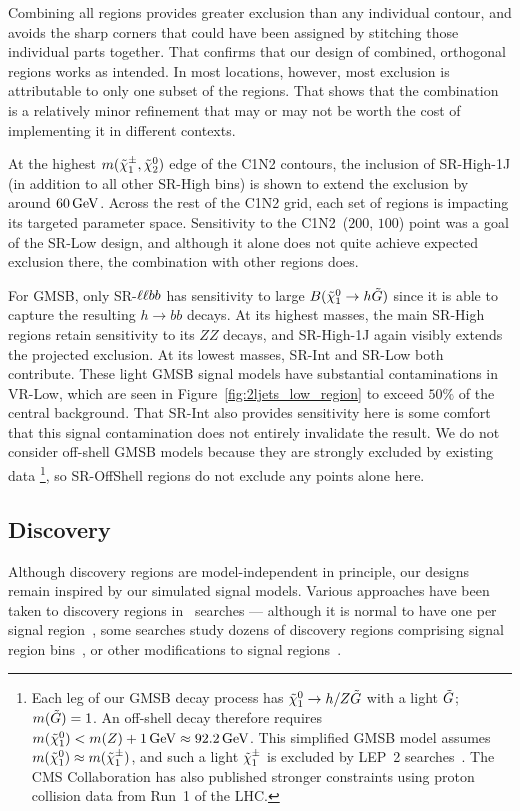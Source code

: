 Combining all regions provides greater exclusion than any individual contour,
and avoids the sharp corners that could have been assigned by stitching those
individual parts together.
That confirms that our design of combined, orthogonal regions works as
intended.
In most locations, however, most exclusion is attributable to only one subset
of the regions.
That shows that the combination is a relatively minor refinement that may or
may not be worth the cost of implementing it in different contexts.

At the highest $m(\chargino_1,\neutralino_2)$ edge of the C1N2 contours,
the inclusion of SR-High-1J (in addition to all other SR-High bins) is shown
to extend the exclusion by around $60\,\eV[G]$.
Across the rest of the C1N2 grid, each set of regions is impacting its targeted
parameter space.
Sensitivity to the C1N2~($200$, $100$) point was a goal of the SR-Low design,
and although it alone does not quite achieve expected exclusion there, the
combination with other regions does.

For GMSB, only SR-$\llbb$ has sensitivity to large
$B(\neutralino_1 \to h \tilde{G})$ since it is able to capture the
resulting $h\to bb$ decays.
At its highest masses, the main SR-High regions retain sensitivity to its
$ZZ$ decays, and SR-High-1J again visibly extends the projected exclusion.
At its lowest masses, SR-Int and SR-Low both contribute.
These light GMSB signal models have substantial contaminations in VR-Low, which
are seen in Figure~\ref{fig:2ljets_low_region} to exceed $50\%$ of the central
background.
That SR-Int also provides sensitivity here is some comfort that this signal
contamination does not entirely invalidate the result.
We do not consider off-shell GMSB models because they are strongly excluded by
existing data%
\footnote{%
Each leg of our GMSB decay process has $\neutralino_1\to h/Z\gravitino$ with a
light $\gravitino$; $m(\gravitino) = 1$.
An off-shell decay therefore requires
$m(\neutralino_1) < m(Z) + 1\,\eV[G] \approx 92.2\,\eV[G]$.
This simplified GMSB model assumes $m(\neutralino_1) \approx m(\chargino_1)$,
and such a light $\chargino_1$ is excluded by LEP~2
searches~\cite{lepsusycombined}.
The CMS Collaboration has also published stronger constraints using proton
collision data from Run~1 of the LHC\cite{
cms_susy_2018_partial_run2_combination,
PhysRevD.90.092007
}.%
},
so SR-OffShell regions do not exclude any points alone here.


\subsection{Discovery}
\label{sec:2ljets_disco}
Although discovery regions are model-independent in principle, our designs
remain inspired by our simulated signal models.
Various approaches have been taken to discovery regions in \atlas\ searches
--- although it is normal to have one per signal region~\cite{SUSY-2018-02},
some searches study dozens of discovery regions comprising signal region
bins~\cite{SUSY-2018-36}, or other modifications to signal
regions~\cite{atlas_susy_compressed_2l_2018_run2}.

